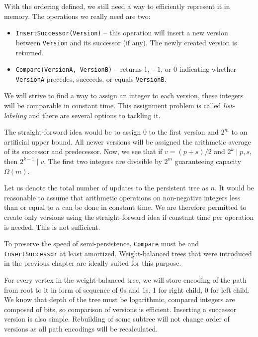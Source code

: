 With the ordering defined, we still need a way to efficiently represent it in memory. The operations we really need are two:

\begin{itemize}
	\item \texttt{InsertSuccessor(Version)} -- this operation will insert a new version between \texttt{Version} and its successor (if any). The newly created version is returned.
	\item \texttt{Compare(VersionA, VersionB)} -- returns 1, $-1$, or 0 indicating whether \texttt{VersionA} precedes, succeeds, or equals \texttt{VersionB}.
\end{itemize}

We will strive to find a way to assign an integer to each version, these integers will be comparable in constant time. This assignment problem is called \emph{list-labeling} and there are several options to tackling it.

The straight-forward idea would be to assign 0 to the first version and $2^m$ to an artificial upper bound. All newer versions will be assigned the arithmetic average of its successor and predecessor. Now, we see that if $v = (p + s)/2$ and $ 2^k \mid p, s$, then $2^{k-1} \mid v$. The first two integers are divisible by $2^m$ guaranteeing capacity $\Omega(m)$. 

Let us denote the total number of updates to the persistent tree as $n$. It would be reasonable to  assume that arithmetic operations on non-negative integers less than or equal to $n$ can be done in constant time. We are therefore permitted to create only  versions using the straight-forward idea if constant time per operation is needed. This is not sufficient.

To preserve the speed of semi-persistence, \texttt{Compare} must be  and \texttt{InsertSuccessor}  at least amortized. Weight-balanced trees that were introduced in the previous chapter are ideally suited for this purpose.

For every vertex in the weight-balanced tree, we will store encoding of the path from root to it in form of sequence of 0s and 1s. 1 for right child, 0 for left child. We know that depth of the tree must be logarithmic, compared integers are composed of  bits, so comparison of versions is efficient. Inserting a successor version is also simple. Rebuilding of some subtree will not change order of versions as all path encodings will be recalculated.


